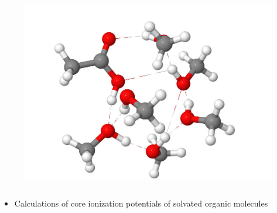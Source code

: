 \documentclass{beamer}
\begin{document}
\begin{frame}
\begin{block}{}
\begin{columns}
\begin{figure}
\centering
\includegraphics[scale=0.07]{figures/6methanol_acetic.jpg}
\end{figure}
\end{columns}
\end{block}

\begin{itemize}
\item Calculations of core ionization potentials of solvated organic molecules
\end{itemize}

\end{frame}
\end{document}
